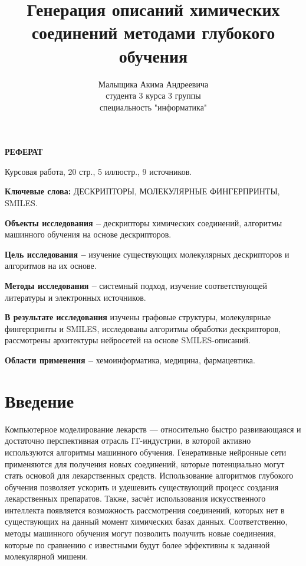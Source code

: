 \documentclass[a4paper,14pt]{extreport}
\title{Генерация описаний химических соединений методами глубокого обучения}
\author{Малыщика Акима Андреевича\\
студента 3 курса 3 группы\\
специальность "информатика"}
\begin{document}
\maketitle
\setcounter{page}{2}
\begin{center}
  \large\bfseries{РЕФЕРАТ}
\end{center}

Курсовая работа, 20 стр., 5 иллюстр., 9 источников.

\textbf{Ключевые слова:} ДЕСКРИПТОРЫ, МОЛЕКУЛЯРНЫЕ ФИНГЕРПРИНТЫ, SMILES.

\textbf{Объекты исследования --} дескрипторы химических соединений, алгоритмы машинного обучения на основе дескрипторов.

\textbf{Цель исследования --} изучение существующих молекулярных дескрипторов и алгоритмов на их основе.

\textbf{Методы исследования --} системный подход, изучение соответствующей литературы и электронных источников.

\textbf{В результате исследования} изучены графовые структуры, молекулярные фингерпринты и SMILES, исследованы алгоритмы обработки дескрипторов, рассмотрены архитектуры нейросетей на основе SMILES-описаний.

\textbf{Области применения --} хемоинформатика, медицина, фармацевтика.

\newpage
  {
    \renewcommand{\contentsname}{Содержание}
    
    \tableofcontents
  }

  \chapter*{Введение}
  \label{c:introduction}

Компьютерное моделирование лекарств — относительно быстро развивающаяся и достаточно перспективная отрасль IT-индустрии, в которой активно используются алгоритмы машинного обучения. Генеративные нейронные сети применяются для получения новых соединений, которые потенциально могут стать основой для лекарственных средств. Использование алгоритмов глубокого обучения позволяет ускорить и удешевить существующий процесс создания лекарственных препаратов. Также, засчёт использования искусственного интеллекта появляется возможность рассмотрения соединений, которых нет в существующих на данный момент химических базах данных. Соответственно, методы машинного обучения могут позволить получить новые соединения, которые по сравнению с известными будут более эффективны к заданной молекулярной мишени.
\end{document}
